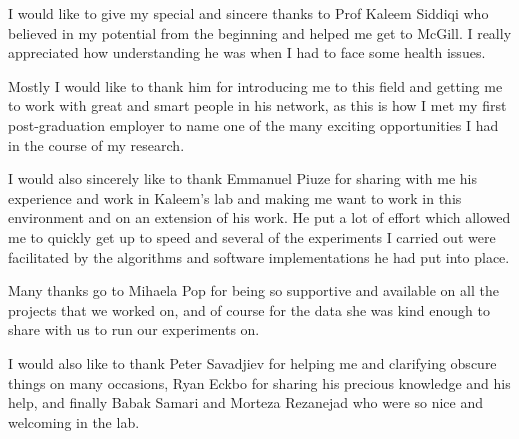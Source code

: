 I would like to give my special and sincere thanks to Prof Kaleem Siddiqi who believed in my potential from the beginning and helped me get to McGill. I really appreciated how understanding he was when I had to face some health issues.

Mostly I would like to thank him for introducing me to this field and getting me to work with great and smart people in his network, as this is how I met my first post-graduation employer to name one of the many exciting opportunities I had in the course of my research.

I would also sincerely like to thank Emmanuel Piuze for sharing with me his experience and work in Kaleem's lab and making me want to work in this environment and on an extension of his work. He put a lot of effort which allowed me to quickly get up to speed and several of the experiments I carried out were facilitated by the algorithms and software implementations he had put into place.

Many thanks go to Mihaela Pop for being so supportive and available on all the projects that we worked on, and of course for the data she was kind enough to share with us to run our experiments on.

I would also like to thank Peter Savadjiev for helping me and clarifying obscure things on many occasions, Ryan Eckbo for sharing his precious knowledge and his help, and finally Babak Samari and Morteza Rezanejad who were so nice and welcoming in the lab.